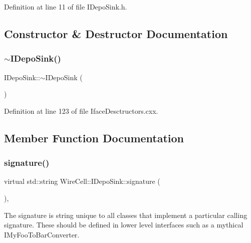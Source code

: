 Definition at line 11 of file I\+Depo\+Sink.\+h.



\subsection{Constructor \& Destructor Documentation}
\mbox{\label{class_wire_cell_1_1_i_depo_sink_a9b31ce6e2b2aee6099917257c55ba71b}} 
\subsubsection{\texorpdfstring{$\sim$\+I\+Depo\+Sink()}{~IDepoSink()}}
{\footnotesize\ttfamily I\+Depo\+Sink\+::$\sim$\+I\+Depo\+Sink (\begin{DoxyParamCaption}{ }\end{DoxyParamCaption})\hspace{0.3cm}{\ttfamily [virtual]}}



Definition at line 123 of file Iface\+Desctructors.\+cxx.



\subsection{Member Function Documentation}
\mbox{\label{class_wire_cell_1_1_i_depo_sink_a9cadeb680909c9d3e4726cd77cfab588}} 
\subsubsection{\texorpdfstring{signature()}{signature()}}
{\footnotesize\ttfamily virtual std\+::string Wire\+Cell\+::\+I\+Depo\+Sink\+::signature (\begin{DoxyParamCaption}{ }\end{DoxyParamCaption})\hspace{0.3cm}{\ttfamily [inline]}, {\ttfamily [virtual]}}

The signature is string unique to all classes that implement a particular calling signature. These should be defined in lower level interfaces such as a mythical I\+My\+Foo\+To\+Bar\+Converter. 

